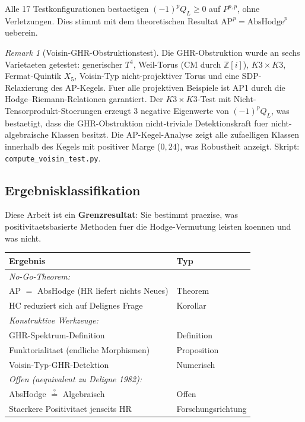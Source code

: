 \documentclass[aps,prd,twocolumn,superscriptaddress,nofootinbib]{revtex4-2}
\theoremstyle{definition}
\theoremstyle{remark}
\newtheorem{remark}[theorem]{Remark}
\begin{document}
Alle 17 Testkonfigurationen bestaetigen $(-1)^p Q_L \geq 0$ auf $P^{p,p}$, ohne Verletzungen. Dies stimmt mit dem theoretischen Resultat $\mathrm{AP}^p = \mathrm{AbsHodge}^p$ ueberein.

\begin{remark}[Voisin-GHR-Obstruktionstest]
\label{rem:voisin-ghr}
Die GHR-Obstruktion wurde an sechs Varietaeten getestet: generischer $T^4$, Weil-Torus (CM durch $\mathbb{Z}[i]$), $K3 \times K3$, Fermat-Quintik $X_5$, Voisin-Typ nicht-projektiver Torus und eine SDP-Relaxierung des AP-Kegels. Fuer alle projektiven Beispiele ist AP1 durch die Hodge--Riemann-Relationen garantiert. Der $K3 \times K3$-Test mit Nicht-Tensorprodukt-Stoerungen erzeugt 3 negative Eigenwerte von $(-1)^p Q_L$, was bestaetigt, dass die GHR-Obstruktion nicht-triviale Detektionskraft fuer nicht-algebraische Klassen besitzt. Die AP-Kegel-Analyse zeigt alle zufaelligen Klassen innerhalb des Kegels mit positiver Marge ($0{,}24$), was Robustheit anzeigt. Skript: \texttt{compute\_voisin\_test.py}.
\end{remark}

\subsection*{Ergebnisklassifikation}

Diese Arbeit ist ein \textbf{Grenzresultat}: Sie bestimmt praezise, was positivitaetsbasierte Methoden fuer die Hodge-Vermutung leisten koennen und was nicht.

\begin{center}
\begin{tabular}{|l|l|}
\hline
\textbf{Ergebnis} & \textbf{Typ} \\
\hline
\hline
\multicolumn{2}{|l|}{\textit{No-Go-Theorem:}} \\
\hline
AP $=$ AbsHodge (HR liefert nichts Neues) & Theorem \\
HC reduziert sich auf Delignes Frage & Korollar \\
\hline
\multicolumn{2}{|l|}{\textit{Konstruktive Werkzeuge:}} \\
\hline
GHR-Spektrum-Definition & Definition \\
Funktorialitaet (endliche Morphismen) & Proposition \\
Voisin-Typ-GHR-Detektion & Numerisch \\
\hline
\multicolumn{2}{|l|}{\textit{Offen (aequivalent zu Deligne 1982):}} \\
\hline
AbsHodge $\stackrel{?}{=}$ Algebraisch & Offen \\
Staerkere Positivitaet jenseits HR & Forschungsrichtung \\
\hline
\end{tabular}
\end{center}
\end{document}
